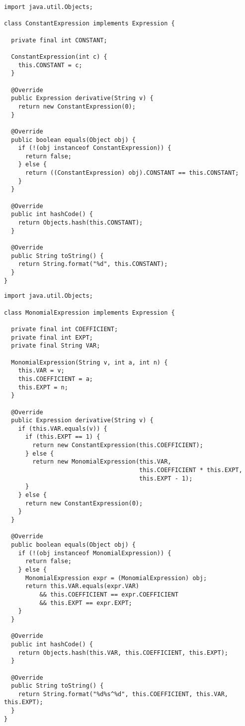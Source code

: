 \begin{lstlisting}[language=MyJava]
import java.util.Objects;

class ConstantExpression implements Expression {

  private final int CONSTANT;

  ConstantExpression(int c) { 
    this.CONSTANT = c; 
  }

  @Override
  public Expression derivative(String v) { 
    return new ConstantExpression(0); 
  }

  @Override
  public boolean equals(Object obj) {
    if (!(obj instanceof ConstantExpression)) { 
      return false; 
    } else { 
      return ((ConstantExpression) obj).CONSTANT == this.CONSTANT; 
    }
  }

  @Override
  public int hashCode() { 
    return Objects.hash(this.CONSTANT); 
  }

  @Override
  public String toString() { 
    return String.format("%d", this.CONSTANT); 
  }
}
\end{lstlisting}

\begin{lstlisting}[language=MyJava]
import java.util.Objects;

class MonomialExpression implements Expression {

  private final int COEFFICIENT;
  private final int EXPT;
  private final String VAR;

  MonomialExpression(String v, int a, int n) { 
    this.VAR = v;
    this.COEFFICIENT = a;
    this.EXPT = n;
  }

  @Override
  public Expression derivative(String v) { 
    if (this.VAR.equals(v)) {
      if (this.EXPT == 1) {
        return new ConstantExpression(this.COEFFICIENT);
      } else {
        return new MonomialExpression(this.VAR, 
                                      this.COEFFICIENT * this.EXPT, 
                                      this.EXPT - 1);
      }
    } else {
      return new ConstantExpression(0);
    } 
  }

  @Override
  public boolean equals(Object obj) {
    if (!(obj instanceof MonomialExpression)) { 
      return false; 
    } else { 
      MonomialExpression expr = (MonomialExpression) obj;
      return this.VAR.equals(expr.VAR)
          && this.COEFFICIENT == expr.COEFFICIENT 
          && this.EXPT == expr.EXPT;
    }
  }

  @Override
  public int hashCode() { 
    return Objects.hash(this.VAR, this.COEFFICIENT, this.EXPT); 
  }

  @Override
  public String toString() { 
    return String.format("%d%s^%d", this.COEFFICIENT, this.VAR, this.EXPT); 
  }
}
\end{lstlisting}


